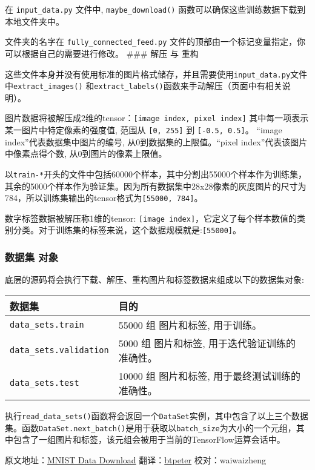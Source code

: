 在 \texttt{input\_data.py} 文件中, \texttt{maybe\_download()}
函数可以确保这些训练数据下载到本地文件夹中。

文件夹的名字在 \texttt{fully\_connected\_feed.py}
文件的顶部由一个标记变量指定，你可以根据自己的需要进行修改。 \#\#\# 解压
与 重构

这些文件本身并没有使用标准的图片格式储存，并且需要使用\texttt{input\_data.py}文件中\texttt{extract\_images()}
和\texttt{extract\_labels()}函数来手动解压（页面中有相关说明）。

图片数据将被解压成2维的tensor：\texttt{{[}image\ index,\ pixel\ index{]}}
其中每一项表示某一图片中特定像素的强度值, 范围从 \texttt{{[}0,\ 255{]}}
到 \texttt{{[}-0.5,\ 0.5{]}}。 ``image index''代表数据集中图片的编号,
从0到数据集的上限值。``pixel index''代表该图片中像素点得个数,
从0到图片的像素上限值。

以\texttt{train-*}开头的文件中包括60000个样本，其中分割出55000个样本作为训练集，其余的5000个样本作为验证集。因为所有数据集中28x28像素的灰度图片的尺寸为784，所以训练集输出的tensor格式为\texttt{{[}55000,\ 784{]}}。

数字标签数据被解压称1维的tensor:
\texttt{{[}image\ index{]}}，它定义了每个样本数值的类别分类。对于训练集的标签来说，这个数据规模就是:\texttt{{[}55000{]}}。

\subsubsection{数据集 对象 }\label{ux6570ux636eux96c6-ux5bf9ux8c61}

底层的源码将会执行下载、解压、重构图片和标签数据来组成以下的数据集对象:

\begin{longtable}[c]{@{}ll@{}}
\toprule
数据集 & 目的\tabularnewline
\midrule
\endhead
\texttt{data\_sets.train} & 55000 组 图片和标签,
用于训练。\tabularnewline
\texttt{data\_sets.validation} & 5000 组 图片和标签,
用于迭代验证训练的准确性。\tabularnewline
\texttt{data\_sets.test} & 10000 组 图片和标签,
用于最终测试训练的准确性。\tabularnewline
\bottomrule
\end{longtable}

执行\texttt{read\_data\_sets()}函数将会返回一个\texttt{DataSet}实例，其中包含了以上三个数据集。函数\texttt{DataSet.next\_batch()}是用于获取以\texttt{batch\_size}为大小的一个元组，其中包含了一组图片和标签，该元组会被用于当前的TensorFlow运算会话中。

\begin{Shaded}
\begin{Highlighting}[]
\OperatorTok{=} 
\end{Highlighting}
\end{Shaded}

原文地址：\href{https://github.com/tensorflow/tensorflow/blob/master/tensorflow/g3doc/tutorials/mnist/download/index.md}{MNIST
Data Download} 翻译：\href{https://github.com/btpeter}{btpeter}
校对：waiwaizheng